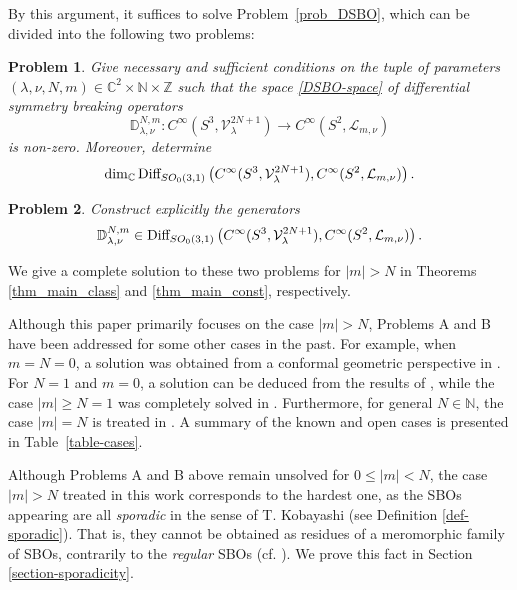 \documentclass[12pt, pdflatex, a4paper]{article}
\theoremstyle{plain}
\newtheorem{probb}{Problem}
\theoremstyle{definition}
\def\C{{\mathbb C}}
\def\Diff{\text{\normalfont{Diff}}}
\def\D{\mathbb{D}}
\def\L{\mathcal{L}}
\def\N{{\mathbb N}}
\def\V{\mathcal{V}}
\def\Z{{\mathbb Z}}
\begin{document}
By this argument, it suffices to solve Problem~\ref{prob_DSBO}, which can be divided into the following two problems:

\begin{probb} Give necessary and sufficient conditions on the tuple of parameters $(\lambda, \nu, N, m) \in \C^2 \times \N \times \Z$
such that the space \eqref{DSBO-space} of differential symmetry breaking operators
\begin{equation*}
\D_{\lambda, \nu}^{N, m}: C^\infty(S^3, \V_\lambda^{2N+1})\rightarrow C^\infty(S^2, \L_{m,\nu})
\end{equation*}
is non-zero. Moreover, determine
\begin{equation*}
\dim_\C \Diff_{SO_0(3,1)}\left(C^\infty(S^3, \V_\lambda^{2N+1}), C^\infty(S^2, \L_{m,\nu})\right).
\end{equation*}
\end{probb}

\begin{probb} Construct explicitly the generators
 \begin{equation*}
\D_{\lambda, \nu}^{N, m} \in \Diff_{SO_0(3,1)}\left(C^\infty(S^3, \V_\lambda^{2N+1}), C^\infty(S^2, \L_{m,\nu})\right).
\end{equation*}
\end{probb}

We give a complete solution to these two problems for $|m| > N$ in Theorems \ref{thm_main_class} and \ref{thm_main_const},  respectively.

Although this paper primarily focuses on the case $|m| > N$, Problems A and B have been addressed for some other cases in the past. For example, when $m = N = 0$, a solution was obtained from a conformal geometric perspective in \cite{Juh09, KOSS15}. For $N=1$ and $m=0$, a solution can be deduced from the results of \cite{KKP16}, while the case $|m| \geq N = 1$ was completely solved in \cite{Per-Val23}. Furthermore, for general $N \in \N$, the case $|m| = N$ is treated in \cite{Per-Val24}. A summary of the known and open cases is presented in Table~\ref{table-cases}.

Although Problems A and B above remain unsolved for $0 \leq |m| < N$, the case $|m| > N$ treated in this work corresponds to the hardest one, as the SBOs appearing are all \emph{sporadic} in the sense of T. Kobayashi (see Definition \ref{def-sporadic}). That is, they cannot be obtained as residues of a meromorphic family of SBOs, contrarily to the \emph{regular} SBOs (cf. \cite{KS15,KS18}). We prove this fact in Section \ref{section-sporadicity}.
\end{document}
